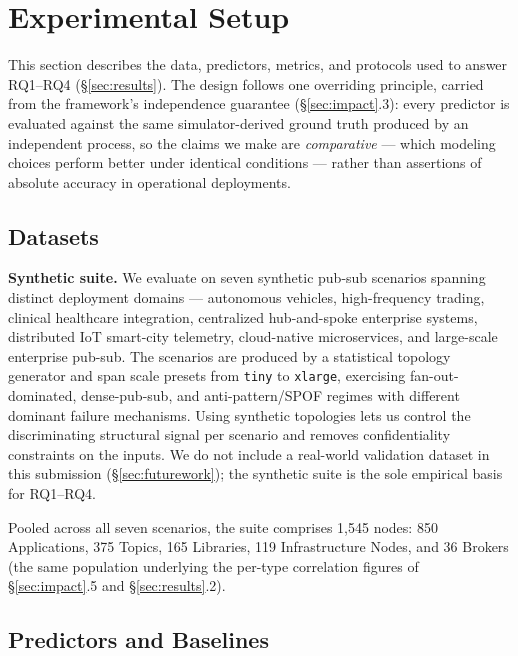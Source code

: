 \documentclass[review]{elsarticle}
\begin{document}
\section{Experimental Setup}
\label{sec:setup}

This section describes the data, predictors, metrics, and protocols used to answer RQ1--RQ4
(\S\ref{sec:results}). The design follows one overriding principle, carried from the framework's
independence guarantee (\S\ref{sec:impact}.3): every predictor is evaluated against the same
simulator-derived ground truth produced by an independent process, so the claims we make are
\emph{comparative} --- which modeling choices perform better under identical conditions --- rather
than assertions of absolute accuracy in operational deployments.

\subsection{Datasets}

\textbf{Synthetic suite.} We evaluate on seven synthetic pub-sub scenarios spanning distinct
deployment domains --- autonomous vehicles, high-frequency trading, clinical healthcare integration,
centralized hub-and-spoke enterprise systems, distributed IoT smart-city telemetry, cloud-native
microservices, and large-scale enterprise pub-sub. The scenarios are produced by a statistical
topology generator and span scale presets from \texttt{tiny} to \texttt{xlarge}, exercising
fan-out-dominated, dense-pub-sub, and anti-pattern/SPOF regimes with different dominant failure
mechanisms. Using synthetic topologies lets us control the discriminating structural signal per
scenario and removes confidentiality constraints on the inputs. We do not include a real-world
validation dataset in this submission (\S\ref{sec:futurework}); the synthetic suite is the sole
empirical basis for RQ1--RQ4.

Pooled across all seven scenarios, the suite comprises 1,545 nodes: 850 Applications, 375 Topics,
165 Libraries, 119 Infrastructure Nodes, and 36 Brokers (the same population underlying the
per-type correlation figures of \S\ref{sec:impact}.5 and \S\ref{sec:results}.2).

\subsection{Predictors and Baselines}
\end{document}
